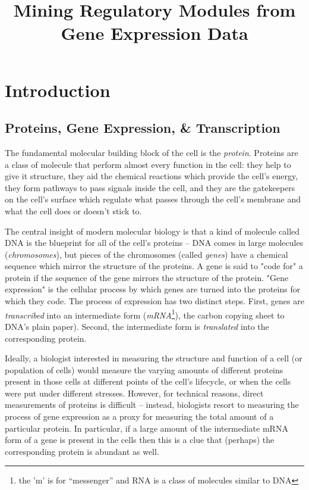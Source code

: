 \documentclass{article}
\title{Mining Regulatory Modules from Gene Expression Data}
\begin{document}
\maketitle

\section{Introduction}

\subsection{Proteins, Gene Expression, \& Transcription} 

The fundamental molecular building block of the cell is the \emph{protein}.  
Proteins are a class of molecule that perform almost every function in the cell: they help to give it structure, they aid the chemical reactions which provide the cell's energy, they form pathways to pass signals inside the cell, and they are the gatekeepers on the cell's surface which regulate what passes through the cell's membrane and what the cell does or doesn't stick to.  

The central insight of modern molecular biology is that a kind of molecule called DNA is the blueprint for all of the cell's proteins -- DNA comes in large molecules (\emph{chromosomes}), but pieces of the chromosomes (called \emph{genes}) have a chemical sequence which mirror the structure of the proteins.  
A gene is said to "code for" a protein if the sequence of the gene mirrors the structure of the protein.
"Gene expression" is the cellular process by which genes are turned into the proteins for which they code.  
The process of expression has two distinct steps.
First, genes are \emph{transcribed} into an intermediate form (\emph{mRNA}\footnote{the 'm' is for ``messenger'' and RNA is a class of molecules similar to DNA}), the carbon copying sheet to DNA's plain paper).  
Second, the intermediate form is \emph{translated} into the corresponding protein.  

Ideally, a biologist interested in measuring the structure and function of a cell (or population of cells) would measure the varying amounts of different proteins present in those cells at different points of the cell's lifecycle, or when the cells were put under different stresses.  
However, for technical reasons, direct measurements of proteins is difficult -- instead, biologists resort to measuring the process of gene expression as a proxy for measuring the total amount of a particular protein.  
In particular, if a large amount of the intermediate mRNA form of a gene is present in the cells then this is a clue that (perhaps) the corresponding protein is abundant as well.  
\end{document}
